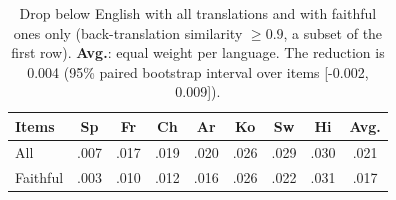 \begin{table}[t]
\centering
\small
\setlength{\tabcolsep}{2.4pt}
\begin{tabular}{lcccccccc}
\toprule
\textbf{Items} & \textbf{Sp} & \textbf{Fr} & \textbf{Ch} & \textbf{Ar} & \textbf{Ko} & \textbf{Sw} & \textbf{Hi} & \textbf{Avg.} \\
\midrule
All & .007 & .017 & .019 & .020 & .026 & .029 & .030 & .021 \\
Faithful & .003 & .010 & .012 & .016 & .026 & .022 & .031 & .017 \\
\bottomrule
\end{tabular}
\caption{Drop below English with all translations and with faithful ones only (back-translation similarity $\ge 0.9$, a subset of the first row). \textbf{Avg.}: equal weight per language. The reduction is 0.004 (95\% paired bootstrap interval over items [-0.002, 0.009]).}
\label{tab:controls}
\end{table}

